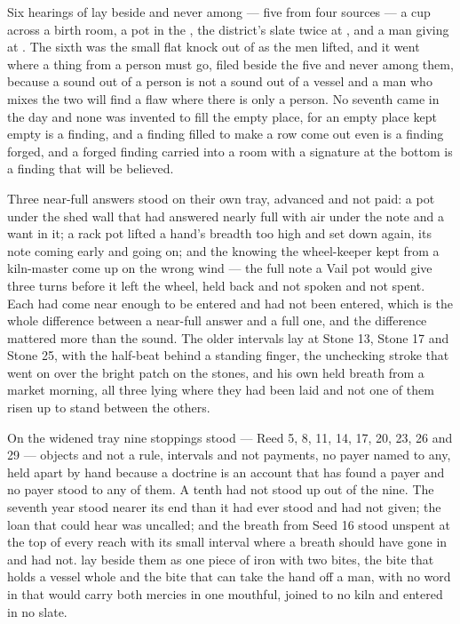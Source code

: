 Six hearings of  lay beside and never among --- five from four sources --- a cup across a birth room, a pot in the , the district's slate twice at , and a man giving at . The sixth was the small flat knock out of  as the men lifted, and it went where a thing from a person must go, filed beside the five and never among them, because a sound out of a person is not a sound out of a vessel and a man who mixes the two will find a flaw where there is only a person. No seventh came in the day and none was invented to fill the empty place, for an empty place kept empty is a finding, and a finding filled to make a row come out even is a finding forged, and a forged finding carried into a room with a signature at the bottom is a finding that will be believed.

Three near-full answers stood on their own tray, advanced and not paid: a pot under the shed wall that had answered nearly full with air under the note and a want in it; a rack pot lifted a hand's breadth too high and set down again, its note coming early and going on; and the knowing the wheel-keeper kept from a kiln-master come up on the wrong wind --- the full note a Vail pot would give three turns before it left the wheel, held back and not spoken and not spent. Each had come near enough to be entered and had not been entered, which is the whole difference between a near-full answer and a full one, and the difference mattered more than the sound. The older intervals lay at Stone 13, Stone 17 and Stone 25, with the half-beat behind a standing finger, the unchecking stroke that went on over the bright patch on the stones, and his own held breath from a market morning, all three lying where they had been laid and not one of them risen up to stand between the others.

On the widened tray nine stoppings stood --- Reed 5, 8, 11, 14, 17, 20, 23, 26 and 29 --- objects and not a rule, intervals and not payments, no payer named to any, held apart by hand because a doctrine is an account that has found a payer and no payer stood to any of them. A tenth had not stood up out of the nine. The seventh year stood nearer its end than it had ever stood and had not given; the loan that could hear was uncalled; and the breath from Seed 16 stood unspent at the top of every reach with its small interval where a breath should have gone in and had not.  lay beside them as one piece of iron with two bites, the bite that holds a vessel whole and the bite that can take the hand off a man, with no word in  that would carry both mercies in one mouthful, joined to no kiln and entered in no slate.

